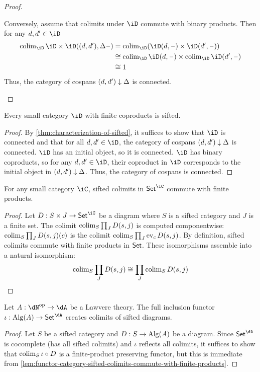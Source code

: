 \documentclass{zett}
\begin{document}
\begin{proof}
\begin{node}
    Conversely, assume that colimits under $\iD$ commute with binary products.
    Then for any $d, d' \in \iD$
    \begin{align}
      \colim_{\iD}\iD \times \iD((d, d'), \Delta\blank) &= \colim_{\iD}(\iD(d, \blank) \times \iD(d', \blank))\\
                                                   &\iso \colim_{\iD}\iD(d, \blank) \times \colim_{\iD}\iD(d', \blank)\\
                                                   &\iso 1
    \end{align}
    Thus, the category of cospans $(d, d') \downarrow \Delta$ is connected.
  \end{node}
\end{proof}

\begin{cor}\label{cor:finite-coproducts-then-sifted}
  Every small category $\iD$ with finite coproducts is sifted.
\end{cor}
\begin{proof}
  By \cref{thm:characterization-of-sifted}, it suffices to show that $\iD$ is connected and that for all $d, d' \in \iD$, the category of cospans $(d, d') \downarrow \Delta$ is connected.
  $\iD$ has an initial object, so it is connected.
  $\iD$ has binary coproducts, so for any $d, d' \in \iD$, their coproduct in $\iD$ corresponds to the initial object in $(d, d') \downarrow \Delta$.
  Thus, the category of cospans is connected.
\end{proof}

\begin{lem}\label{lem:functor-category-sifted-colimits-commute-with-finite-products}
  For any small category $\iC$, sifted colimits in $\CSet^{\iC}$ commute with finite products.
\end{lem}
\begin{proof}
  Let $D : S \times J \to \CSet^{\iC}$ be a diagram where $S$ is a sifted category and $J$ is a finite set.
  The colimit $\operatorname{colim}_{S}\prod_{J}D(s,j)$ is computed componentwise: $\operatorname{colim}_{S}\prod_{J}D(s,j)(c)$ is the colimit $\operatorname{colim}_{S}\prod_{J}\operatorname{ev}_{c}D(s,j)$.
  By definition, sifted colimits commute with finite products in $\mathsf{Set}$.
  These isomorphisms assemble into a natural isomorphism:
  \[
    \operatorname{colim}_{S}\prod_{J}D(s,j) \cong \prod_{J}\operatorname{colim}_{S}D(s,j)
  \]
\end{proof}

\begin{lem}
  Let $A : \dN\op \to \dA$ be a Lawvere theory.
  The full inclusion functor $\iota : \Alg(A) \to \CSet^{\dA}$ creates colimits of sifted diagrams.
\end{lem}
\begin{proof}
  Let $S$ be a sifted category and $D : S \to \operatorname{Alg}(A)$ be a diagram.
  Since $\CSet^{\dA}$ is cocomplete (has all sifted colimits) and $\iota$ reflects all colimits, it suffices to show that $\operatorname{colim}_{S}\iota \circ D$ is a finite-product preserving functor, but this is immediate from \cref{lem:functor-category-sifted-colimits-commute-with-finite-products}.
\end{proof}
\end{document}
